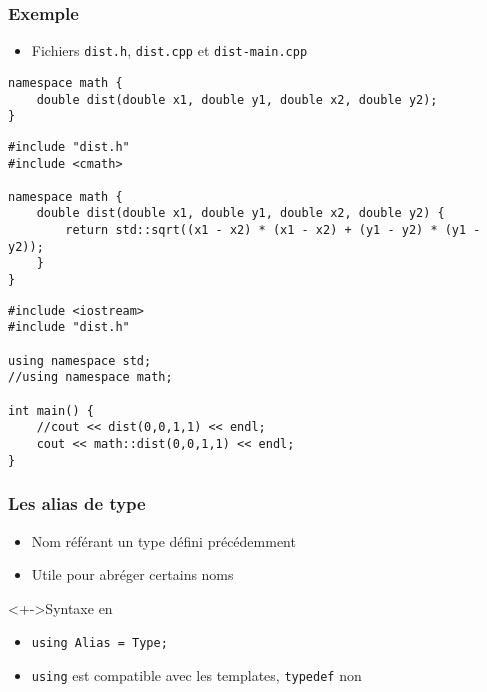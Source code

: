 \begin{frame}[containsverbatim]
\frametitle{Exemple}
\begin{itemize}
\item Fichiers \texttt{dist.h}, \texttt{dist.cpp} et \texttt{dist-main.cpp}
\end{itemize}
\begin{lstlisting}
namespace math {
	double dist(double x1, double y1, double x2, double y2);	
}
\end{lstlisting}
\begin{lstlisting}
#include "dist.h"
#include <cmath>

namespace math {
	double dist(double x1, double y1, double x2, double y2)	{
		return std::sqrt((x1 - x2) * (x1 - x2) + (y1 - y2) * (y1 - y2));
	}
}
\end{lstlisting}
\begin{lstlisting}
#include <iostream>
#include "dist.h"

using namespace std;
//using namespace math;

int main() {
	//cout << dist(0,0,1,1) << endl;
	cout << math::dist(0,0,1,1) << endl;
}
\end{lstlisting}
\end{frame}

\begin{frame}
\frametitle{Les alias de type}
\begin{itemize}[<+->]
\item Nom référant un type défini précédemment
\item Utile pour abréger certains noms
\end{itemize}
\begin{exampleblock}<+->{Syntaxe en \cpp}
	\begin{itemize}[<+->]
	\item \lstinline|using Alias = Type;|
	\end{itemize}
\end{exampleblock}
\begin{itemize}[<+->]
\item \lstinline|using| est compatible avec les templates, \lstinline|typedef| non
\end{itemize}
\end{frame}


